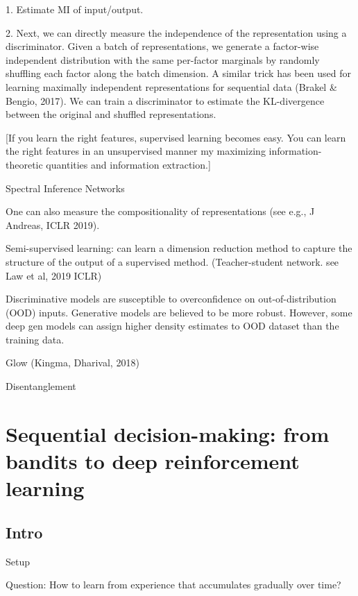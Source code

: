\documentclass[english]{article}
\begin{document}
1. Estimate MI of input/output. 

2. Next, we can directly measure the independence of the representation using a discriminator. Given a
batch of representations, we generate a factor-wise independent distribution with the same per-factor
marginals by randomly shuffling each factor along the batch dimension. A similar trick has been used
for learning maximally independent representations for sequential data (Brakel \& Bengio, 2017). We
can train a discriminator to estimate the KL-divergence between the original and shuffled representations.


[If you learn the right features, supervised learning becomes easy. You can learn the right features in an unsupervised manner my maximizing information-theoretic quantities and information extraction.]

\item Spectral Inference Networks

One can also measure the compositionality of representations (see e.g., J Andreas, ICLR 2019).

\item Semi-supervised learning: can learn a dimension reduction method to capture the structure of the output of a supervised method. (Teacher-student network. see Law et al, 2019 ICLR)

\item Discriminative models are susceptible to overconfidence on out-of-distribution (OOD) inputs. Generative models are believed to be more robust. However, some deep gen models can assign higher density estimates to OOD dataset than the training data.

\item Glow (Kingma, Dharival, 2018)

Disentanglement
\eenum



\section{Sequential decision-making: from bandits to deep reinforcement learning}

\subsection{Intro}

\benum

\item {Setup}
\bitem
\item Question: How to learn from experience that accumulates gradually over time?
\end{document}
